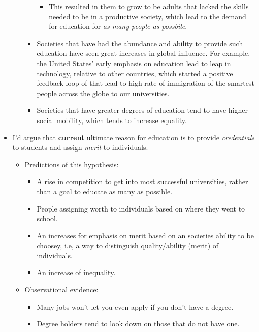 \documentclass[12pt,a4paper]{article}
\begin{document}
\begin{itemize}
\begin{itemize}
\begin{itemize}
\begin{itemize}
                            \item This resulted in them to grow to be adults that lacked the skills needed to be in a productive society, which lead to the demand for education for \textit{as many people as possbile}.
                        \end{itemize}
                    \item Societies that have had the abundance and ability to provide such education have seen great increases in global influence. For example, the United States' early emphasis on education lead to leap in technology, relative to other countries, which started a positive feedback loop of that lead to high rate of immigration of the smartest people across the globe to our universities.
                    \item Societies that have greater degrees of education tend to have higher social mobility, which tends to increase equality.
                \end{itemize}
        \end{itemize}
    \item I'd argue that \textbf{current} ultimate reason for education is to provide \textit{credentials} to students and assign \textit{merit} to individuals. 
        \begin{itemize}
            \item Predictions of this hypothesis:
                \begin{itemize}
                    \item A rise in competition to get into most successful universities, rather than a goal to educate as many as possible.
                    \item People assigning worth to individuals based on where they went to school.
                    \item An increases for emphasis on merit based on an societies ability to be choosey, i.e, a way to  distinguish quality/ability (merit) of individuals.
                    \item An increase of inequality.
                \end{itemize}
            \item Observational evidence:
                \begin{itemize}
                    \item Many jobs won't let you even apply if you don't have a degree. 
                    \item Degree holders tend to look down on those that do not have one.

\end{itemize}
\end{itemize}
\end{itemize}
\end{document}
